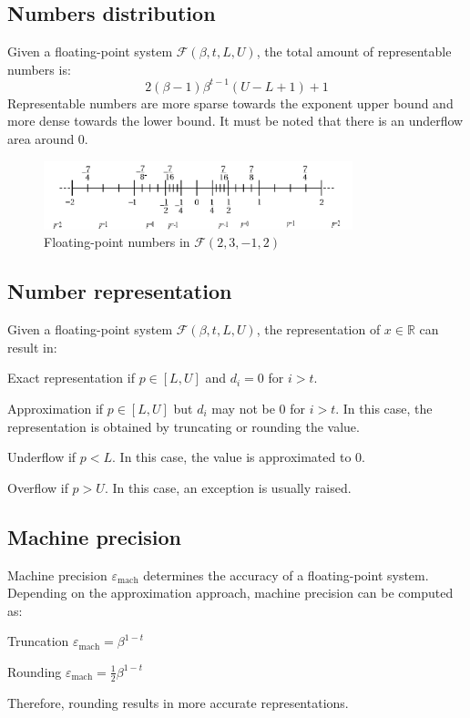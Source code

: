 \subsection{Numbers distribution}
Given a floating-point system $\mathcal{F}(\beta, t, L, U)$, the total amount of representable numbers is:
\begin{equation*}
    2(\beta-1) \beta^{t-1} (U-L+1)+1
\end{equation*}
%
Representable numbers are more sparse towards the exponent upper bound and more dense towards the lower bound.
It must be noted that there is an underflow area around 0.
\begin{figure}[H]
    \centering
    \includegraphics[width=0.8\textwidth]{img/floatingpoint_range.png}
    \caption{Floating-point numbers in $\mathcal{F}(2, 3, -1, 2)$}
\end{figure}


\subsection{Number representation}
Given a floating-point system $\mathcal{F}(\beta, t, L, U)$, the representation of $x \in \mathbb{R}$ can result in:
\begin{descriptionlist}
    \item[Exact representation] 
        if $p \in [L, U]$ and $d_i=0$ for $i>t$.

    \item[Approximation] 
        if $p \in [L, U]$ but $d_i$ may not be 0 for $i>t$. 
        In this case, the representation is obtained by truncating or rounding the value.

    \item[Underflow] 
        if $p < L$. In this case, the value is approximated to 0.

    \item[Overflow] 
        if $p > U$. In this case, an exception is usually raised.
\end{descriptionlist}


\subsection{Machine precision}
Machine precision $\varepsilon_{\text{mach}}$ determines the accuracy of a floating-point system. 
Depending on the approximation approach, machine precision can be computed as:
\begin{descriptionlist}
    \item[Truncation] $\varepsilon_{\text{mach}} = \beta^{1-t}$
    \item[Rounding] $\varepsilon_{\text{mach}} = \frac{1}{2}\beta^{1-t}$
\end{descriptionlist}
Therefore, rounding results in more accurate representations.

